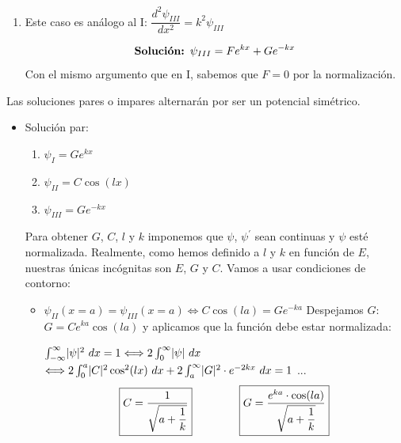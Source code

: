 \documentclass{report}
\begin{document}
{\begin{enumerate}
                  \begin{align*}
                    \begin{split}
                  \text{\textbf{Soluciones: }}\psi_{II}=C^\prime e^{ilx}+D^\prime e^{-ilx}\\
                  \psi_{II}=C\cos(lx)+D\sin(lx)
                    \end{split}
                  \end{align*}

            \item Este caso es análogo al I: $\dfrac{d^2\psi_{III}}{dx^2}=k^2\psi_{III}$
            
                  \[\text{\textbf{Solución: }}\psi_{III}=Fe^{kx}+Ge^{-kx}\]
                  Con el mismo argumento que en I, sabemos que $F=0$ por la normalización.
            
          \end{enumerate}
          Las soluciones pares o impares alternarán por ser un potencial simétrico.
          \begin{itemize}
            \item Solución par:
                  \begin{enumerate}
                    \item $\psi_{I}=Ge^{kx}$
                    \item $\psi_{II}=C\cos(lx)$
                    \item $\psi_{III}=Ge^{-kx}$
                  \end{enumerate}
                  Para obtener $G$, $C$, $l$ y $k$ imponemos que $\psi$, $\psi^\prime$ sean continuas
                  y $\psi$ esté normalizada. Realmente, como hemos definido a $l$ y $k$ en función de 
                  $E$, nuestras únicas incógnitas son $E$, $G$ y $C$. Vamos a usar condiciones de contorno:
                  \begin{itemize}
                    \item $\psi_{II}(x=a)=\psi_{III}(x=a)\Longleftrightarrow C\cos(la)=Ge^{-ka}$
                          Despejamos $G$: $G=Ce^{ka}\cos(la)$ y aplicamos que la función debe estar
                          normalizada:

                          $\int_{-\infty}^{\infty}\abs{\psi}^2\ dx=1\Longleftrightarrow2\int_{0}^{\infty}
                          \abs{\psi}\ dx$ %
                          $\Longleftrightarrow 2\int_{0}^{a}\lvert C\rvert^2\cos^2(lx)\ dx+2\int_a^{\infty}\lvert G\rvert^2
                          \cdot e^{-2kx}\ dx= 1$ ... 
                          \[\boxed{C=\dfrac{1}{\sqrt{a+\dfrac{1}{k}}}}\hspace{1.5cm}\boxed{G=\dfrac{e^{ka}
                          \cdot\cos(la)}{\sqrt{a+\dfrac{1}{k}}}}\]


\end{itemize}
\end{itemize}}
\end{document}

